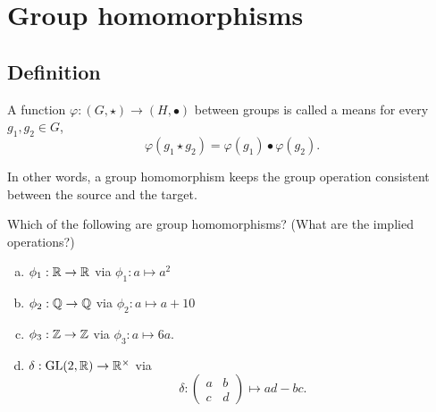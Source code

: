 \documentclass[../algebraNotesMSRI-UP2016.tex]{subfiles}
\begin{document}
\section[\S \thesection]{Group homomorphisms}\label{sec:2p6groupHomomorphisms}
\subsection[\subsecname]{Definition}
\begin{frame}[c]{\subsecname}{}
\begin{dfn}
A function $\varphi:(G,\star)\to(H,\bullet)$ between groups is called a  means for every $g_1,g_2\in G$,
\[
\varphi(g_1\star g_2)=\varphi(g_1)\bullet\varphi(g_2).
\]
\end{dfn}

\smallGap
In other words, a group homomorphism keeps the group operation consistent between the source and the target.
\end{frame}

\begin{frame}
\begin{exe}[cf. Problem 62]\label{exe:detExample}
Which of the following are group homomorphisms? (What are the implied operations?)
\begin{enumerate}[(a)]
\item $\phi_1:\mathbb R\to \mathbb R$ via $\phi_1:a\mapsto a^2$
\item $\phi_2:\mathbb Q\to \mathbb Q$ via $\phi_2:a\mapsto a+10$
\item $\phi_3:\mathbb Z\to \mathbb Z$ via $\phi_3:a\mapsto 6a$.
\item\label{expt:detExampled} $\delta:\operatorname{GL}(2,\mathbb R)\to \mathbb R^{\times}$ via 
\[
\delta: \begin{pmatrix}
	a & b \\
	c & d 
	\end{pmatrix}
	\mapsto ad-bc.
\]
\end{enumerate}
\end{exe}
\end{frame}

\end{document}

